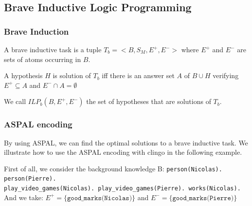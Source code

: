 
\subsection{Brave Inductive Logic Programming}

\subsubsection{Brave Induction}

\begin{definition}

A brave inductive task is a tuple $T_b=<B, S_M, E^+, E^->$ where $E^+$ and $E^-$ are sets of atoms occurring in $B$. 

\smallskip

A hypothesis $H$ is solution of $T_b$ iff there is an answer set $A$ of $B\cup H$ verifying $E^+\subseteq A$ and $E^-\cap A = \emptyset$

\smallskip

We call $ILP_b(B,E^+,E^-)$ the set of hypotheses that are solutions of $T_b$. 

\end{definition}

\subsubsection{ASPAL encoding}

By using ASPAL, we can find the optimal solutions to a brave inductive task. We
illustrate how to use the ASPAL encoding with clingo in the following example.\bigskip

First of all, we consider the background knowledge B:\newline
\texttt{person(Nicolas). person(Pierre).\\
play\_video\_games(Nicolas). play\_video\_games(Pierre). works(Nicolas).}\\

And we take: $E^+=\{\texttt{good\_marks(Nicolas)}\}$ and $E^-=\{\texttt{good\_marks(Pierre)}\}$

